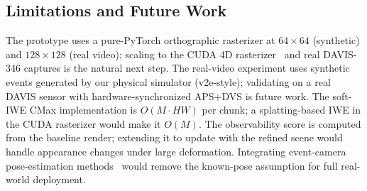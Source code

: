 \subsection{Limitations and Future Work}
The prototype uses a pure-PyTorch orthographic rasterizer at $64{\times}64$ (synthetic) and $128{\times}128$ (real video); scaling to the CUDA 4D rasterizer~\cite{wu20244dgs} and real DAVIS-346 captures is the natural next step. The real-video experiment uses synthetic events generated by our physical simulator (v2e-style); validating on a real DAVIS sensor with hardware-synchronized APS+DVS is future work. The soft-IWE CMax implementation is $O(M\cdot HW)$ per chunk; a splatting-based IWE in the CUDA rasterizer would make it $O(M)$. The observability score is computed from the baseline render; extending it to update with the refined scene would handle appearance changes under large deformation. Integrating event-camera pose-estimation methods~\cite{liu2026eventpose,liu2024lopet,yuan2026p2p} would remove the known-pose assumption for full real-world deployment.
